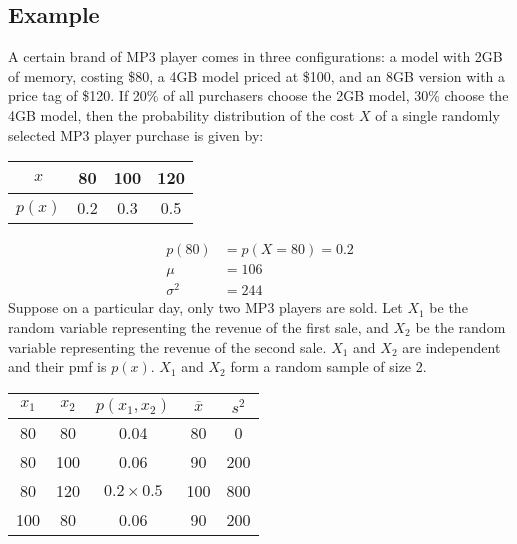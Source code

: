 \documentclass[letterpaper, 12pt]{math}
\begin{document}
\subsection*{Example}
A certain brand of MP3 player comes in three configurations: a model with 2GB
of memory, costing \$80, a 4GB model priced at \$100, and an 8GB version with
a price tag of \$120. If 20\% of all purchasers choose the 2GB model, 30\%
choose the 4GB model, then the probability distribution of the cost \( X \) of
a single randomly selected MP3 player purchase is given by:
\begin{center}
  \begin{tabular}{|c|c|c|c|}
    \hline
    \( x \) & 80 & 100 & 120 \\
    \hline
    \( p(x) \) & 0.2 & 0.3 & 0.5 \\
    \hline
  \end{tabular}
\end{center}
\begin{align*}
  p(80) &= p(X=80) = 0.2 \\
  \mu &= 106 \\
  \sigma^{2} &= 244
\end{align*}
Suppose on a particular day, only two MP3 players are sold. Let \( X_{1} \) be
the random variable representing the revenue of the first sale, and \( X_{2} \)
be the random variable representing the revenue of the second sale. \( X_{1} \)
and \( X_{2} \) are independent and their pmf is \( p(x) \). \( X_{1} \) and
\( X_{2} \) form a random sample of size 2.
\begin{center}
  \begin{tabular}{|c|c|c|c|c|}
    \hline
    \( x_{1} \) & \( x_{2} \) & \( p(x_{1},x_{2}) \) & \( \overline{x} \) &
      \( s^{2} \) \\
    \hline
    80 & 80 & 0.04 & 80 & 0 \\
    \hline
    80 & 100 & 0.06 & 90 & 200 \\
    \hline
    80 & 120 & \( 0.2\times0.5 \) & 100 & 800 \\
    \hline
    100 & 80 & 0.06 & 90 & 200 \\
    \hline
  \end{tabular}
\end{center}
\end{document}

